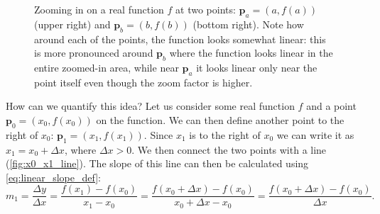 \begin{figure}
  \caption{Zooming in on a real function $f$ at two points: $\bm{p}_{a}=\left(a,f(a)\right)$ (upper right) and $\bm{p}_{b}=\left(b,f(b)\right)$ (bottom right). Note how around each of the points, the function looks somewhat linear: this is more pronounced around $\bm{p}_{b}$ where the function looks linear in the entire zoomed-in area, while near $\bm{p}_{a}$ it looks linear only near the point itself even though the zoom factor is higher.}
  \label{fig:zoom_in}
\end{figure}

How can we quantify this idea? Let us consider some real function $f$ and a point $\bm{p}_{0} = \left(x_{0},f\left(x_{0}\right)\right)$ on the function. We can then define another point to the right of $x_{0}$: $\bm{p}_{1}=\left(x_{1},f\left(x_{1}\right)\right)$. Since $x_{1}$ is to the right of $x_{0}$ we can write it as $x_{1}=x_{0}+\Delta x$, where $\Delta x>0$. We then connect the two points with a line (\autoref{fig:x0_x1_line}). The slope of this line can then be calculated using \autoref{eq:linear_slope_def}:
\begin{equation}
  m_{1} = \frac{\Delta y}{\Delta x} = \frac{f\left(x_{1}\right)-f\left(x_{0}\right)}{x_{1}-x_{0}} = \frac{f\left(x_{0}+\Delta x\right)-f\left(x_{0}\right)}{x_{0}+\Delta x - x_{0}} = \frac{f\left(x_{0}+\Delta x\right)-f\left(x_{0}\right)}{\Delta x}.
  \label{eq:derivative_slope_def}
\end{equation}

